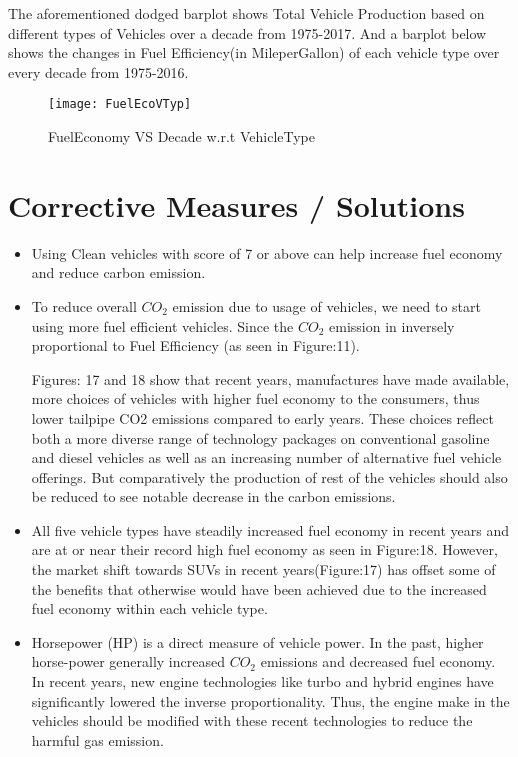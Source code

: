 \documentclass{acm_proc_article-sp}
\begin{document}
The aforementioned dodged barplot shows Total Vehicle Production based on different types of Vehicles over a decade from 1975-2017. And a barplot below shows the changes in Fuel Efficiency(in MileperGallon) of each vehicle type over every decade from 1975-2016.

\begin{figure}[H]
\centering
\texttt{[image: FuelEcoVTyp]}
\caption{FuelEconomy VS Decade w.r.t VehicleType}
\end{figure}

\section{Corrective Measures / Solutions}
\begin{itemize}

    \item Using Clean vehicles with score of 7 or above can help increase fuel economy and reduce carbon emission.
    
    \item To reduce overall $CO_{2}$ emission due to usage of vehicles, we need to start using more fuel efficient vehicles. Since the $CO_{2}$ emission in inversely proportional to Fuel Efficiency (as seen in Figure:11).
    
    Figures: 17 and 18 show that recent years, manufactures have made available, more choices of vehicles with higher fuel economy to the consumers, thus lower tailpipe CO2 emissions compared to early years. These choices reflect both a more diverse range of technology packages on conventional gasoline and diesel vehicles as well as an increasing number of alternative fuel vehicle offerings. But comparatively the production of rest of the vehicles should also be reduced to see notable decrease in the carbon emissions.
    
    \item All five vehicle types have steadily increased fuel economy in recent years and are at or near their record high fuel economy as seen in Figure:18. However, the market shift towards SUVs in recent years(Figure:17) has offset some of the benefits that otherwise would have been achieved due to the increased fuel economy within each vehicle type.
    
    \item Horsepower (HP) is a direct measure of vehicle power. In the past, higher horse-power generally increased $CO_{2}$ emissions and decreased fuel economy. In recent years, new engine technologies like turbo and hybrid engines have significantly lowered the inverse proportionality. Thus, the engine make in the vehicles should be modified with these recent technologies to reduce the harmful gas emission. 
    

\end{itemize}
\end{document}
